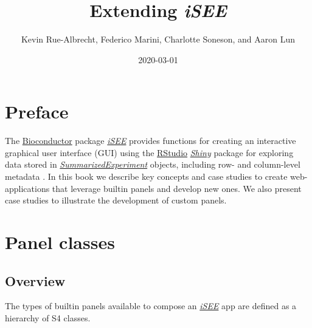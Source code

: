 \documentclass[]{book}
\title{Extending \emph{iSEE}}
\author{Kevin Rue-Albrecht, Federico Marini, Charlotte Soneson, and Aaron Lun}
\date{2020-03-01}
\begin{document}
\maketitle

{
\setcounter{tocdepth}{1}
\tableofcontents
}
\chapter*{Preface}\label{preface}

The \href{https://bioconductor.org/}{Bioconductor} package
\emph{\href{https://bioconductor.org/packages/3.11/iSEE}{iSEE}} provides
functions for creating an interactive graphical user interface (GUI)
using the \href{https://rstudio.com/}{RStudio}
\emph{\href{https://CRAN.R-project.org/package=Shiny}{Shiny}} package
for exploring data stored in
\emph{\href{https://bioconductor.org/packages/3.11/SummarizedExperiment}{SummarizedExperiment}}
objects, including row- and column-level metadata \citep{rue2018isee}.
In this book we describe key concepts and case studies to create
web-applications that leverage builtin panels and develop new ones. We
also present case studies to illustrate the development of custom
panels.

\hypertarget{panels}{\chapter{Panel classes}\label{panels}}

\section{Overview}\label{overview}

The types of builtin panels available to compose an
\emph{\href{https://bioconductor.org/packages/3.11/iSEE}{iSEE}} app are
defined as a hierarchy of S4 classes.
\end{document}
